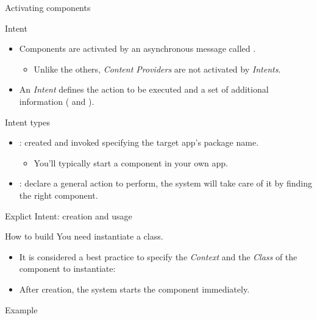 \documentclass{beamer}
\begin{document}
\begin{frame}{Activating components}
  \begin{block}{Intent}
    \begin{itemize}
      \item Components are activated by an asynchronous message called .
      \begin{itemize}
        \item Unlike the others, \textit{Content Providers} are not activated by \textit{Intents}.
      \end{itemize}
      \item An \textit{Intent} defines the action to be executed and a set of additional information ( and ).
    \end{itemize}
  \end{block}
  \begin{block}{Intent types}
    \begin{itemize}
      \item {}: created and invoked specifying the target app's package name.
      \begin{itemize}
        \item You'll typically start a component in your own app.
      \end{itemize}
      \item {}: declare a general action to perform, the system will take care of it by finding the right component.
    \end{itemize}
  \end{block}
\end{frame}


\begin{frame}{Explict Intent: creation and usage}
  \begin{block}{How to build}
    You need instantiate a  class.
    \begin{itemize}
      \item It is considered a best practice to specify the \textit{Context} and the \textit{Class} of the component to instantiate:\newline{}
      \item After creation, the system starts the component immediately.
    \end{itemize}
  \end{block}
  \begin{exampleblock}{Example}
    
  \end{exampleblock}
\end{frame}
\end{document}
